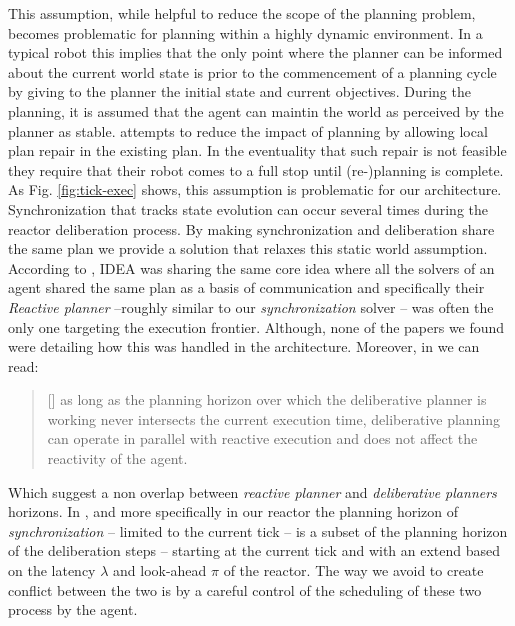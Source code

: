 This assumption, while helpful to reduce the scope of the planning
problem, becomes problematic for planning within a highly dynamic
environment. In a typical robot this implies that the only point where
the planner can be informed about the current world state is prior to
the commencement of a planning cycle by giving to the planner the
initial state and current objectives. During the planning, it is
assumed that the agent can maintin the world as perceived by the
planner as stable. \cite{lemai04, lemai-chenevier2004} attempts to
reduce the impact of planning by allowing local plan repair in the
existing plan. In the eventuality that such repair is not feasible
they require that their robot comes to a full stop until (re-)planning
is complete.%
As Fig. \ref{fig:tick-exec} shows, this assumption is problematic for our
architecture. Synchronization that tracks state evolution can occur
several times during the reactor deliberation process. By making
synchronization and deliberation share the same plan we provide a
solution that relaxes this static world assumption. According to 
\cite{Dias:2003ua, mus06}, IDEA was sharing the same core idea 
where all the solvers of an agent shared the same plan as a basis of
communication and specifically their {\em Reactive planner} --roughly
similar to our {\em synchronization} solver -- was often the only one 
targeting the execution frontier. Although, none of the papers we
found were detailing how this was handled in the
architecture. Moreover, in \cite{Dias:2003ua} we can read:
\begin{quotation}
  [\textellipsis] as long as the planning horizon over which the
  deliberative planner is working never intersects the current
  execution time, deliberative planning can operate in parallel with
  reactive execution and does not affect the reactivity of the agent. 
\end{quotation}
Which suggest a non overlap between {\em reactive planner} and {\em
  deliberative planners} horizons. In \rx, and more specifically in
our \eu reactor the planning horizon of {\em synchronization} -- 
limited to the current tick -- is a subset of the planning horizon 
of the deliberation steps -- starting at the current tick and with an
extend based on the latency $\lambda$ and look-ahead $\pi$ of 
the reactor. The way we avoid to create conflict between the two is by
a careful control of the scheduling of these two process by the \rx 
agent.


